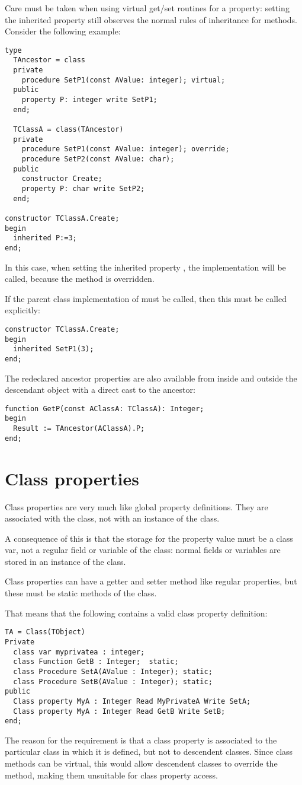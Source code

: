 Care must be taken when using virtual get/set routines for a property:
setting the inherited property still observes the normal rules of inheritance
for methods. Consider the following example:
\begin{verbatim}
type
  TAncestor = class
  private
    procedure SetP1(const AValue: integer); virtual;
  public
    property P: integer write SetP1;
  end;

  TClassA = class(TAncestor)
  private
    procedure SetP1(const AValue: integer); override;
    procedure SetP2(const AValue: char);
  public
    constructor Create;
    property P: char write SetP2;
  end;

constructor TClassA.Create;
begin
  inherited P:=3;
end;
\end{verbatim}
In this case, when setting the inherited property , the
implementation  will be called, because the
 method is overridden.

If the parent class implementation of  must be called,
then this must be called explicitly:
\begin{verbatim}
constructor TClassA.Create;
begin
  inherited SetP1(3);
end;
\end{verbatim}

The redeclared ancestor properties are also available from inside and outside
the descendant object with a direct cast to the ancestor:
\begin{verbatim}
function GetP(const AClassA: TClassA): Integer;
begin
  Result := TAncestor(AClassA).P;
end;
\end{verbatim}

\section{Class properties}
Class properties are very much like global property definitions. They are
associated with the class, not with an instance of the class.

A consequence of this is that the storage for the property value must be a
class var, not a regular field or variable of the class: normal fields or
variables are stored in an instance of the class.

Class properties can have a getter and setter method like regular
properties, but these must be static methods of the class.

That means that the following contains a valid class property definition:
\begin{verbatim}
TA = Class(TObject)
Private
  class var myprivatea : integer;
  class Function GetB : Integer;  static;
  class Procedure SetA(AValue : Integer); static;
  class Procedure SetB(AValue : Integer); static;
public
  Class property MyA : Integer Read MyPrivateA Write SetA;
  Class property MyA : Integer Read GetB Write SetB;
end;
\end{verbatim}
The reason for the requirement is that a class property is associated to
the particular class in which it is defined, but not to descendent classes.
Since class methods can be virtual, this would allow descendent classes
to override the method, making them unsuitable for class property access.



